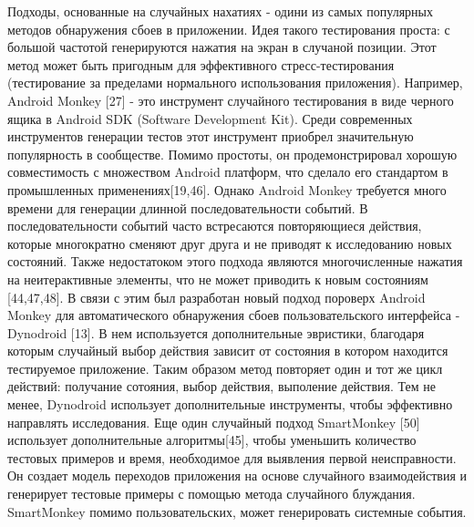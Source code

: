 Подходы, основанные на случайных нахатиях - одини из самых популярных методов обнаружения сбоев в приложении. Идея такого тестирования проста: с большой частотой генерируются нажатия на экран в случаной позиции. Этот метод может быть пригодным для эффективного стресс-тестирования (тестирование за пределами нормального использования приложения). Например, Android Monkey [27] - это инструмент случайного тестирования в виде черного ящика в Android SDK (Software Development Kit). Среди современных инструментов генерации тестов этот инструмент приобрел значительную популярность в сообществе. Помимо простоты, он продемонстрировал хорошую совместимость с множеством Android платформ, что сделало его стандартом в промышленных применениях[19,46]. Однако Android Monkey требуется много времени для генерации длинной последовательности событий. В последовательности событий часто встресаются повторяющиеся действия, которые многократно сменяют друг друга и не приводят к исследованию новых состояний. Также недостатоком этого подхода являются многочисленные нажатия на неитерактивные элементы, что не может приводить к новым состояниям [44,47,48]. В связи с этим был разработан новый подход пороверх Android Monkey для автоматического обнаружения сбоев пользовательского интерфейса - Dynodroid [13]. В нем используется дополнительные эвристики, благодаря которым случайный выбор действия зависит от состояния в котором находится тестируемое приложение. Таким образом метод повторяет один и тот же цикл действий: получание сотояния, выбор действия, выполение действия. Тем не менее, Dynodroid использует дополнительные инструменты, чтобы эффективно направлять исследования. Еще один случайный подход SmartMonkey [50] использует дополнительные алгоритмы[45], чтобы уменьшить количество тестовых примеров и время, необходимое для выявления первой неисправности. Он создает модель переходов приложения на основе случайного взаимодействия и генерирует тестовые примеры с помощью метода случайного блуждания. SmartMonkey помимо пользовательских, может генерировать системные события.

